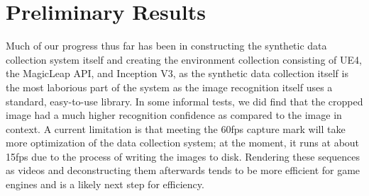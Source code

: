 \vspace{-1em}
\section{Preliminary Results}
Much of our progress thus far has been in constructing the synthetic data collection system itself and creating the environment collection consisting of UE4, the MagicLeap API, and Inception V3, as the synthetic data collection itself is the most laborious part of the system as the image recognition itself uses a standard, easy-to-use library. In some informal tests, we did find that the cropped image had a much higher recognition confidence as compared to the image in context. A current limitation is that meeting the 60fps capture mark will take more optimization of the data collection system; at the moment, it runs at about 15fps due to the process of writing the images to disk. Rendering these sequences as videos and deconstructing them afterwards tends to be more efficient for game engines and is a likely next step for efficiency.